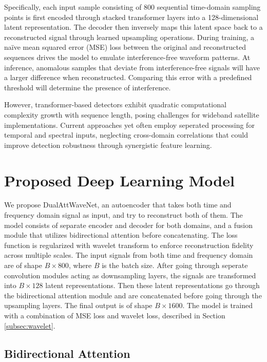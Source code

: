 \documentclass[conference]{IEEEtran}
\begin{document}
Specifically, each input sample consisting of 800 sequential time-domain sampling points is first encoded through stacked transformer layers into a 128-dimensional latent representation. The decoder then inversely maps this latent space back to a reconstructed signal through learned upsampling operations. During training, a naïve mean squared error (MSE) loss between the original and reconstructed sequences drives the model to emulate interference-free waveform patterns. At inference, anomalous samples that deviate from interference-free signals will have a larger difference when reconstructed. Comparing this error with a predefined threshold will determine the presence of interference.

However, transformer-based detectors exhibit quadratic computational complexity growth with sequence length, posing challenges for wideband satellite implementations. Current approaches yet often employ seperated processing for temporal and spectral inputs, neglecting cross-domain correlations that could improve detection robustness through synergistic feature learning.

\section{Proposed Deep Learning Model}
\label{sec:model}

We propose DualAttWaveNet, an autoencoder that takes both time and frequency domain signal as input, and try to reconstruct both of them. The model consists of separate encoder and decoder for both domains, and a fusion module that utilizes bidirectional attention before concatenating. The loss function is regularized with wavelet transform to enforce reconstruction fidelity across multiple scales. The input signals from both time and frequency domain are of shape $B \times 800$, where $B$ is the batch size. After going through seperate convolution modules acting as downsampling layers, the signals are transformed into $B \times 128$ latent representations. Then these latent representations go through the bidirectional attention module and are concatenated before going through the upsampling layers. The final output is of shape $B \times 1600$. The model is trained with a combination of MSE loss and wavelet loss, described in Section \ref{subsec:wavelet}.

\subsection{Bidirectional Attention}
\label{subsec:bi_attn}
\end{document}
